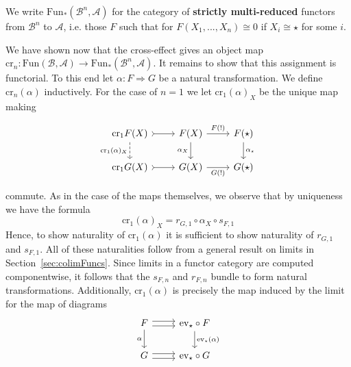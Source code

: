 \begin{defn}{}
    We write $\text{Fun}_*(\mathcal{B}^n,\mathcal{A})$ for the category of \textbf{strictly multi-reduced} functors from $\mathcal{B}^n$ to $\mathcal{A}$, i.e. those $F$ such that for $F(X_1,...,X_n)\cong 0$ if $X_i \cong \star$ for some $i$.
\end{defn}


We have shown now that the cross-effect gives an object map $\text{cr}_n:\text{Fun}(\mathcal{B},\mathcal{A})\rightarrow \text{Fun}_*(\mathcal{B}^n,\mathcal{A})$. It remains to show that this assignment is functorial. To this end let $\alpha:F\Rightarrow G$ be a natural transformation. We define $\text{cr}_n(\alpha)$ inductively. For the case of $n = 1$ we let $\text{cr}_1(\alpha)_X$ be the unique map making

\[\begin{tikzcd}
	{\text{cr}_1F(X)} & {F(X)} & {F(\star)} \\
	{\text{cr}_1G(X)} & {G(X)} & {G(\star)}
	\arrow["{F(!)}", from=1-2, to=1-3]
	\arrow["{G(!)}"', from=2-2, to=2-3]
	\arrow["{\alpha_\star}", from=1-3, to=2-3]
	\arrow["{\alpha_X}"', from=1-2, to=2-2]
	\arrow[tail, from=1-1, to=1-2]
	\arrow[tail, from=2-1, to=2-2]
	\arrow["{\text{cr}_1(\alpha)_X}"', dashed, from=1-1, to=2-1]
\end{tikzcd}\]

\noindent commute. As in the case of the maps themselves, we observe that by uniqueness we have the formula 
\begin{equation}\label{eq:natProjFormula1}
    \text{cr}_1(\alpha)_X = r_{G,1}\circ \alpha_X\circ s_{F,1}
\end{equation}
Hence, to show naturality of $\text{cr}_1(\alpha)$ it is sufficient to show naturality of $r_{G,1}$ and $s_{F,1}$. All of these naturalities follow from a general result on limits in Section~\ref{sec:colimFuncs}. Since limits in a functor category are computed componentwise, it follows that the $s_{F,n}$ and $r_{F,n}$ bundle to form natural transformations. Additionally, $\text{cr}_1(\alpha)$ is precisely the map induced by the limit for the map of diagrams
\[\begin{tikzcd}
	F & {\text{ev}_\star\circ F} \\
	G & {\text{ev}_\star\circ G}
	\arrow[shift left, from=1-1, to=1-2]
	\arrow[shift right, from=1-1, to=1-2]
	\arrow["\alpha"', from=1-1, to=2-1]
	\arrow[shift left, from=2-1, to=2-2]
	\arrow[shift right, from=2-1, to=2-2]
	\arrow["{\text{ev}_\star(\alpha)}", from=1-2, to=2-2]
\end{tikzcd}\]



